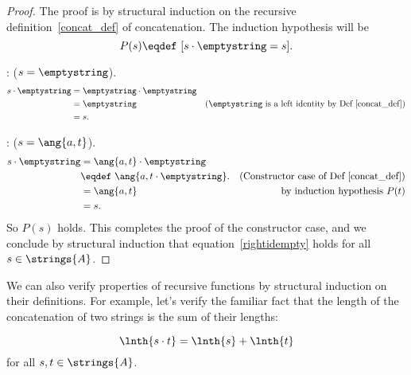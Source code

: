 \begin{proof}
The proof is by structural induction on the recursive
definition~\ref{concat_def} of concatenation.  The induction
hypothesis will be
\[
P(s) \eqdef\ [s \cdot \emptystring = s].
\]

: ($s = \emptystring$).
\begin{align*}
s \cdot \emptystring
    & = \emptystring \cdot \emptystring\\
    & = \emptystring
        & \text{($\emptystring$ is a left identity by Def~\ref{concat_def})}\\
    & = s.
\end{align*}

: ($s = \ang{a,t}$).
\begin{align*}
s \cdot \emptystring
   & = \ang{a,t} \cdot \emptystring\\
   & \eqdef\ \ang{a, t \cdot \emptystring}.
       & \text{(Constructor case of Def~\ref{concat_def})}\\
   & = \ang{a,t}
        & \text{by induction hypothesis $P(t)$}\\
   & = s.
\end{align*}
So $P(s)$ holds.  This completes the proof of the constructor case,
and we conclude by structural induction that
equation~\eqref{rightidempty} holds for all $s \in \strings{A}$.
\end{proof}

We can also verify properties of recursive functions by structural
induction on their definitions.  For example, let's verify the
familiar fact that the length of the concatenation of two strings is
the sum of their lengths:

\begin{lemma*}
\[
\lnth{s\cdot t} = \lnth{s} + \lnth{t}
\]
for all $s,t \in \strings{A}$.
\end{lemma*}

